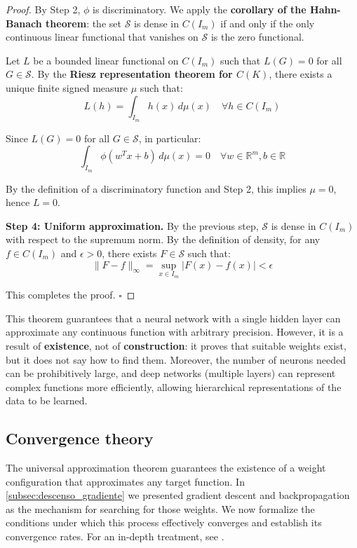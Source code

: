 \begin{proof}
	By Step 2, \(\phi\) is discriminatory. We apply the \textbf{corollary of the Hahn-Banach theorem}: the set \(\mathcal{S}\) is dense in \(C(I_m)\) if and only if the only continuous linear functional that vanishes on \(\mathcal{S}\) is the zero functional.

	Let \(L\) be a bounded linear functional on \(C(I_m)\) such that \(L(G) = 0\) for all \(G \in \mathcal{S}\). By the \textbf{Riesz representation theorem for \(C(K)\)}, there exists a unique finite signed measure \(\mu\) such that:
	\[
		L(h) = \int_{I_m} h(x) \, d\mu(x) \quad \forall h \in C(I_m)
	\]

	Since \(L(G) = 0\) for all \(G \in \mathcal{S}\), in particular:
	\[
		\int_{I_m} \phi(w^T x + b) \, d\mu(x) = 0 \quad \forall w \in \mathbb{R}^m, b \in \mathbb{R}
	\]

	By the definition of a discriminatory function and Step 2, this implies \(\mu = 0\), hence \(L = 0\).

	\textbf{Step 4: Uniform approximation.}
	By the previous step, \(\mathcal{S}\) is dense in \(C(I_m)\) with respect to the supremum norm. By the definition of density, for any \(f \in C(I_m)\) and \(\epsilon > 0\), there exists \(F \in \mathcal{S}\) such that:
	\[
		\|F - f\|_\infty = \sup_{x \in I_m} |F(x) - f(x)| < \epsilon
	\]

	This completes the proof. \(\square\)
\end{proof}

This theorem guarantees that a neural network with a single hidden layer can approximate any continuous function with arbitrary precision. However, it is a result of \textbf{existence}, not of \textbf{construction}: it proves that suitable weights exist, but it does not say how to find them. Moreover, the number of neurons needed can be prohibitively large, and deep networks (multiple layers) can represent complex functions more efficiently, allowing hierarchical representations of the data to be learned.

\subsection{Convergence theory}\label{subsec:teoria_convergencia}

The universal approximation theorem guarantees the existence of a weight configuration that approximates any target function. In \autoref{subsec:descenso_gradiente} we presented gradient descent and backpropagation as the mechanism for searching for those weights. We now formalize the conditions under which this process effectively converges and establish its convergence rates. For an in-depth treatment, see \citet{bottou2018optimization}.

